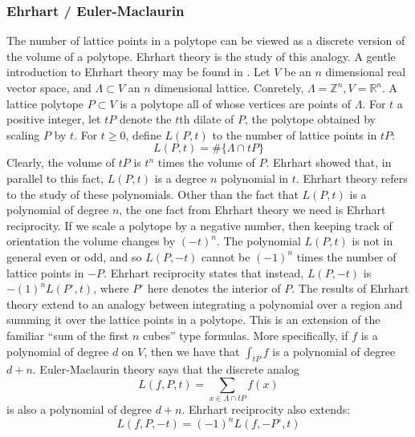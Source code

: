 \documentclass{amsart}[12pt]
\theoremstyle{definition}
\newcommand{\Z}{\mathbb{Z}}
\newcommand{\R}{\mathbb{R}}
\begin{document}
\subsubsection{Ehrhart / Euler-Maclaurin}
The number of lattice points in a polytope can be viewed as a discrete version of the volume of a polytope. Ehrhart theory is the study of this analogy. A gentle introduction to Ehrhart theory may be found in \cite{BR}.
Let $V$ be an $n$ dimensional real vector space, and $\Lambda\subset V$ an $n$ dimensional lattice. Conretely, $\Lambda=\Z^n, V=\R^n$. A lattice polytope $P\subset V$ is a polytope all of whose vertices are points of $\Lambda$.
For $t$ a positive integer, let $tP$ denote the $t$th dilate of $P$, the polytope obtained by scaling $P$ by $t$. For $t\geq 0$, define $L(P,t)$ to the number of lattice points in $tP$:
$$L(P,t)=\#\{\Lambda\cap tP\}$$
Clearly, the volume of $tP$ is $t^n$ times the volume of $P$. Ehrhart showed that, in parallel to this fact, $L(P,t)$ is a degree $n$ polynomial in $t$. Ehrhart theory refers to the study of these polynomials.
Other than the fact that $L(P,t)$ is a polynomial of degree $n$, the one fact from Ehrhart theory we need is Ehrhart reciprocity. If we scale a polytope by a negative number, then keeping track of orientation the volume changes by $(-t)^n$. The polynomial $L(P,t)$ is not in general even or odd, and so $L(P,-t)$ cannot be $(-1)^n$ times the number of lattice points in $-P$. Ehrhart reciprocity states that instead, $L(P,-t)$ is $-(1)^nL(P^\circ, t)$, where $P^\circ$ here denotes the interior of $P$.
The results of Ehrhart theory extend to an analogy between integrating a polynomial over a region and summing it over the lattice points in a polytope. This is an extension of the familiar ``sum of the first $n$ cubes'' type formulas.
More specifically, if $f$ is a polynomial of degree $d$ on $V$, then we have that $\int_{tP} f$ is a polynomial of degree $d+n$. Euler-Maclaurin theory says that the discrete analog
$$L(f, P, t)=\sum_{x\in\Lambda\cap tP} f(x)$$
is also a polynomial of degree $d+ n$. Ehrhart reciprocity also extends: $$L(f,P,-t)=(-1)^nL(f, -P^\circ, t)$$
\end{document}
